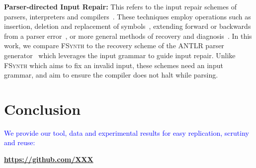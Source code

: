 \documentclass[sigconf,review,anonymous]{acmart}
\newcounter{todocounter}
\newcommand{\todo}[1]{\marginpar{$|$}\textcolor{red}{\stepcounter{todocounter}\footnote[\thetodocounter]{\textcolor{red}{\textbf{TODO }}\textit{#1}}}}
\newcommand{\revise}[1]{\textcolor{blue}{#1}}
\renewcommand{\todo}[1]{}
\newcommand{\approach}{\textsc{FSynth}\xspace}
\begin{document}
\noindent
\textbf{Parser-directed Input Repair:}
This refers to the input repair schemes of parsers, interpreters and compilers~\cite{parr2011ll, diekmann2020dont, aho1972minimum, hammond1984survey, backhouse1979syntax}. 
These techniques employ operations such as insertion, deletion and replacement of symbols~\cite{anderson1981locally, cerecke2003locally, anderson1983assessment}, extending forward or backwards from a parser error~\cite{burke1982practical, mauney1982forward}, or more general methods of recovery and diagnosis~\cite{krawczyk1980error, aho1972minimum}. 
In this work, we compare \approach to the recovery scheme of the ANTLR parser generator~\cite{parr2011ll} which leverages the input grammar to guide input repair. %
Unlike \approach which aims to fix an invalid input, these schemes need an input grammar, and aim to ensure the compiler does not halt while parsing. 

%




\section{Conclusion}
\label{sec:conclusion}

\todo{discuss potential future works}

\revise{We provide our tool, data and experimental results for easy replication, scrutiny and reuse:
}

 \begin{center}
 \vspace{-0.2mm}
     \textbf{\url{https://github.com/XXX}}
 \end{center}





\end{document}
